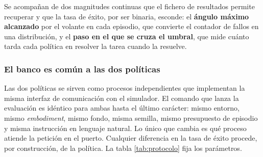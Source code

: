 Se acompañan de dos magnitudes continuas que el fichero de resultados permite recuperar y que la
tasa de éxito, por ser binaria, esconde: el \textbf{ángulo máximo alcanzado} por el volante en cada
episodio, que convierte el contador de fallos en una distribución, y el \textbf{paso en el que se
cruza el umbral}, que mide cuánto tarda cada política en resolver la tarea cuando la resuelve.

\subsubsection{El banco es común a las dos políticas}

Las dos políticas se sirven como procesos independientes que implementan la misma interfaz de
comunicación con el simulador. El comando que lanza la evaluación es idéntico para ambas hasta el
último carácter: mismo entorno, mismo \textit{embodiment}, mismo fondo, misma semilla, mismo
presupuesto de episodio y misma instrucción en lenguaje natural. Lo único que cambia es qué proceso
atiende la petición en el puerto. Cualquier diferencia en la tasa de éxito procede, por
construcción, de la política. La tabla \ref{tab:protocolo} fija los parámetros.

\begin{table}[ht]
	\centering
	\caption{Parámetros fijos de toda evaluación}
	\label{tab:protocolo}
\end{table}

